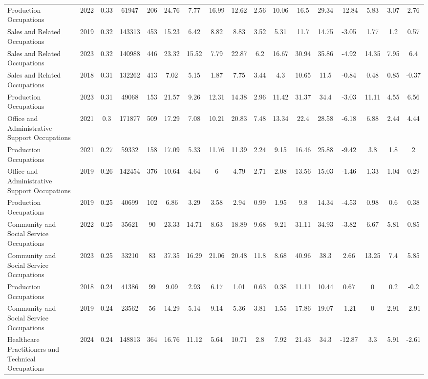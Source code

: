 \begin{landscape}
\begin{table}[htbp]
\begin{tabular}{lcccccccccccccccc}
Production Occupations & 2022 & 0.33 & 61947 & 206 & 24.76 & 7.77 & 16.99 & 12.62 & 2.56 & 10.06 & 16.5 & 29.34 & -12.84 & 5.83 & 3.07 & 2.76 \\
Sales and Related Occupations & 2019 & 0.32 & 143313 & 453 & 15.23 & 6.42 & 8.82 & 8.83 & 3.52 & 5.31 & 11.7 & 14.75 & -3.05 & 1.77 & 1.2 & 0.57 \\
Sales and Related Occupations & 2023 & 0.32 & 140988 & 446 & 23.32 & 15.52 & 7.79 & 22.87 & 6.2 & 16.67 & 30.94 & 35.86 & -4.92 & 14.35 & 7.95 & 6.4 \\
Sales and Related Occupations & 2018 & 0.31 & 132262 & 413 & 7.02 & 5.15 & 1.87 & 7.75 & 3.44 & 4.3 & 10.65 & 11.5 & -0.84 & 0.48 & 0.85 & -0.37 \\
Production Occupations & 2023 & 0.31 & 49068 & 153 & 21.57 & 9.26 & 12.31 & 14.38 & 2.96 & 11.42 & 31.37 & 34.4 & -3.03 & 11.11 & 4.55 & 6.56 \\
Office and Administrative Support Occupations & 2021 & 0.3 & 171877 & 509 & 17.29 & 7.08 & 10.21 & 20.83 & 7.48 & 13.34 & 22.4 & 28.58 & -6.18 & 6.88 & 2.44 & 4.44 \\
Production Occupations & 2021 & 0.27 & 59332 & 158 & 17.09 & 5.33 & 11.76 & 11.39 & 2.24 & 9.15 & 16.46 & 25.88 & -9.42 & 3.8 & 1.8 & 2 \\
Office and Administrative Support Occupations & 2019 & 0.26 & 142454 & 376 & 10.64 & 4.64 & 6 & 4.79 & 2.71 & 2.08 & 13.56 & 15.03 & -1.46 & 1.33 & 1.04 & 0.29 \\
Production Occupations & 2019 & 0.25 & 40699 & 102 & 6.86 & 3.29 & 3.58 & 2.94 & 0.99 & 1.95 & 9.8 & 14.34 & -4.53 & 0.98 & 0.6 & 0.38 \\
Community and Social Service Occupations & 2022 & 0.25 & 35621 & 90 & 23.33 & 14.71 & 8.63 & 18.89 & 9.68 & 9.21 & 31.11 & 34.93 & -3.82 & 6.67 & 5.81 & 0.85 \\
Community and Social Service Occupations & 2023 & 0.25 & 33210 & 83 & 37.35 & 16.29 & 21.06 & 20.48 & 11.8 & 8.68 & 40.96 & 38.3 & 2.66 & 13.25 & 7.4 & 5.85 \\
Production Occupations & 2018 & 0.24 & 41386 & 99 & 9.09 & 2.93 & 6.17 & 1.01 & 0.63 & 0.38 & 11.11 & 10.44 & 0.67 & 0 & 0.2 & -0.2 \\
Community and Social Service Occupations & 2019 & 0.24 & 23562 & 56 & 14.29 & 5.14 & 9.14 & 5.36 & 3.81 & 1.55 & 17.86 & 19.07 & -1.21 & 0 & 2.91 & -2.91 \\
Healthcare Practitioners and Technical Occupations & 2024 & 0.24 & 148813 & 364 & 16.76 & 11.12 & 5.64 & 10.71 & 2.8 & 7.92 & 21.43 & 34.3 & -12.87 & 3.3 & 5.91 & -2.61 \\

\end{tabular}
\end{table}
\end{landscape}
